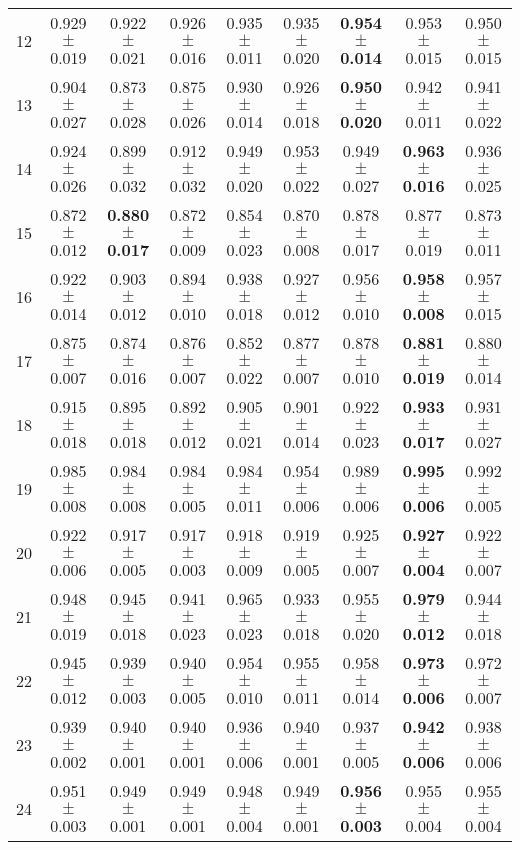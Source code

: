 \begin{table}[!ht]
{\begin{tabular}{r c c c c c c c c}
12 & 0.929 $\pm$ 0.019 & 0.922 $\pm$ 0.021 & 0.926 $\pm$ 0.016 & 0.935 $\pm$ 0.011 & 0.935 $\pm$ 0.020 & \textbf{0.954 $\pm$ 0.014} & 0.953 $\pm$ 0.015 & 0.950 $\pm$ 0.015 \\
13 & 0.904 $\pm$ 0.027 & 0.873 $\pm$ 0.028 & 0.875 $\pm$ 0.026 & 0.930 $\pm$ 0.014 & 0.926 $\pm$ 0.018 & \textbf{0.950 $\pm$ 0.020} & 0.942 $\pm$ 0.011 & 0.941 $\pm$ 0.022 \\
14 & 0.924 $\pm$ 0.026 & 0.899 $\pm$ 0.032 & 0.912 $\pm$ 0.032 & 0.949 $\pm$ 0.020 & 0.953 $\pm$ 0.022 & 0.949 $\pm$ 0.027 & \textbf{0.963 $\pm$ 0.016} & 0.936 $\pm$ 0.025 \\
15 & 0.872 $\pm$ 0.012 & \textbf{0.880 $\pm$ 0.017} & 0.872 $\pm$ 0.009 & 0.854 $\pm$ 0.023 & 0.870 $\pm$ 0.008 & 0.878 $\pm$ 0.017 & 0.877 $\pm$ 0.019 & 0.873 $\pm$ 0.011 \\
16 & 0.922 $\pm$ 0.014 & 0.903 $\pm$ 0.012 & 0.894 $\pm$ 0.010 & 0.938 $\pm$ 0.018 & 0.927 $\pm$ 0.012 & 0.956 $\pm$ 0.010 & \textbf{0.958 $\pm$ 0.008} & 0.957 $\pm$ 0.015 \\
17 & 0.875 $\pm$ 0.007 & 0.874 $\pm$ 0.016 & 0.876 $\pm$ 0.007 & 0.852 $\pm$ 0.022 & 0.877 $\pm$ 0.007 & 0.878 $\pm$ 0.010 & \textbf{0.881 $\pm$ 0.019} & 0.880 $\pm$ 0.014 \\
18 & 0.915 $\pm$ 0.018 & 0.895 $\pm$ 0.018 & 0.892 $\pm$ 0.012 & 0.905 $\pm$ 0.021 & 0.901 $\pm$ 0.014 & 0.922 $\pm$ 0.023 & \textbf{0.933 $\pm$ 0.017} & 0.931 $\pm$ 0.027 \\
19 & 0.985 $\pm$ 0.008 & 0.984 $\pm$ 0.008 & 0.984 $\pm$ 0.005 & 0.984 $\pm$ 0.011 & 0.954 $\pm$ 0.006 & 0.989 $\pm$ 0.006 & \textbf{0.995 $\pm$ 0.006} & 0.992 $\pm$ 0.005 \\
20 & 0.922 $\pm$ 0.006 & 0.917 $\pm$ 0.005 & 0.917 $\pm$ 0.003 & 0.918 $\pm$ 0.009 & 0.919 $\pm$ 0.005 & 0.925 $\pm$ 0.007 & \textbf{0.927 $\pm$ 0.004} & 0.922 $\pm$ 0.007 \\
21 & 0.948 $\pm$ 0.019 & 0.945 $\pm$ 0.018 & 0.941 $\pm$ 0.023 & 0.965 $\pm$ 0.023 & 0.933 $\pm$ 0.018 & 0.955 $\pm$ 0.020 & \textbf{0.979 $\pm$ 0.012} & 0.944 $\pm$ 0.018 \\
22 & 0.945 $\pm$ 0.012 & 0.939 $\pm$ 0.003 & 0.940 $\pm$ 0.005 & 0.954 $\pm$ 0.010 & 0.955 $\pm$ 0.011 & 0.958 $\pm$ 0.014 & \textbf{0.973 $\pm$ 0.006} & 0.972 $\pm$ 0.007 \\
23 & 0.939 $\pm$ 0.002 & 0.940 $\pm$ 0.001 & 0.940 $\pm$ 0.001 & 0.936 $\pm$ 0.006 & 0.940 $\pm$ 0.001 & 0.937 $\pm$ 0.005 & \textbf{0.942 $\pm$ 0.006} & 0.938 $\pm$ 0.006 \\
24 & 0.951 $\pm$ 0.003 & 0.949 $\pm$ 0.001 & 0.949 $\pm$ 0.001 & 0.948 $\pm$ 0.004 & 0.949 $\pm$ 0.001 & \textbf{0.956 $\pm$ 0.003} & 0.955 $\pm$ 0.004 & 0.955 $\pm$ 0.004 \\

\end{tabular}}
\end{table}
